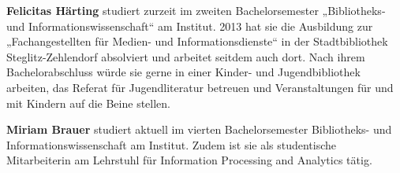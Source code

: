 \documentclass[a4paper,
fontsize=11pt,
oneside,
numbers=noperiodatend,
parskip=half-,
bibliography=totoc,
final
]{scrartcl}
\begin{document}
\textbf{Felicitas Härting} studiert zurzeit im zweiten Bachelorsemester
„Bibliotheks- und Informationswissenschaft`` am Institut. 2013 hat sie
die Ausbildung zur „Fachangestellten für Medien- und
Informationsdienste`` in der Stadtbibliothek Steglitz-Zehlendorf
absolviert und arbeitet seitdem auch dort. Nach ihrem Bachelorabschluss
würde sie gerne in einer Kinder- und Jugendbibliothek arbeiten, das
Referat für Jugendliteratur betreuen und Veranstaltungen für und mit
Kindern auf die Beine stellen.

\textbf{Miriam Brauer} studiert aktuell im vierten Bachelorsemester
Bibliotheks- und Informationswissenschaft am Institut. Zudem ist sie als
studentische Mitarbeiterin am Lehrstuhl für Information Processing and
Analytics tätig.
\end{document}
